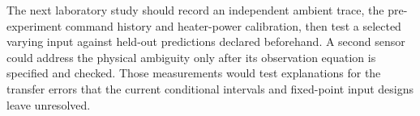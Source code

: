 The next laboratory study should record an independent ambient trace, the
pre-experiment command history and heater-power calibration, then test a
selected varying input against held-out predictions declared beforehand. A
second sensor could address the physical ambiguity only after its observation
equation is specified and checked. Those measurements would test explanations
for the transfer errors that the current conditional intervals and fixed-point
input designs leave unresolved.
